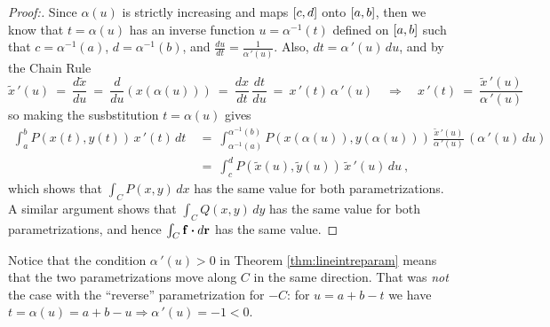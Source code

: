 \begin{proofbar}\begin{proof}[Proof:]
 Since $\alpha(u)$ is strictly increasing and maps $\lbrack c,d \rbrack$ onto $\lbrack a,b \rbrack$, then we know that $t=\alpha(u)$ has
 an inverse function $u=\alpha^{-1}(t)$ defined on $\lbrack a,b \rbrack$ such that $c=\alpha^{-1}(a)$,
 $d=\alpha^{-1}(b)$, and $\frac{du}{dt} = \frac{1}{\alpha\,'(u)}$. Also, $dt = \alpha\,'(u)\,du$, and by the Chain Rule
 \begin{displaymath}
  \tilde{x}\,'(u) ~=~ \frac{d\tilde{x}}{du} ~=~ \frac{d}{du}(x(\alpha(u))) ~=~ \frac{dx}{dt}\,\frac{dt}{du} ~=~
  x\,'(t)\,\alpha\,'(u) \quad\Rightarrow\quad x\,'(t) ~=~ \frac{\tilde{x}\,'(u)}{\alpha\,'(u)}
 \end{displaymath}
 so making the susbstitution $t=\alpha(u)$ gives
 \begin{align*}
  \int_a^b P(x(t),y(t))\,x\,'(t)\,dt ~&=~
   \int_{\alpha^{-1}(a)}^{\alpha^{-1}(b)} P(x(\alpha(u)),y(\alpha(u)))\,\frac{\tilde{x}\,'(u)}{\alpha\,'(u)}
   \,(\alpha\,'(u)\,du)\\
   &=~ \int_c^d P(\tilde{x}(u),\tilde{y}(u))\,\tilde{x}\,'(u)\,du ~,
 \end{align*}
 which shows that $\int_C P(x,y)\,dx$ has the same value for both parametrizations. A similar argument shows that
 $\int_C Q(x,y)\,dy$ has the same value for both parametrizations, and hence $\int_C \mathbf{f} \bm{\cdot} d\mathbf{r}$
 has the same value.
 
\end{proof}\end{proofbar}

Notice that the condition $\alpha\,'(u) > 0$ in Theorem \ref{thm:lineintreparam} means that the two parametrizations
move along $C$ in the same direction. That was \emph{not} the case with the ``reverse'' parametrization for $-C$: for
$u=a+b-t$ we have $t=\alpha(u)=a+b-u \Rightarrow \alpha\,'(u) = -1 <0$.

